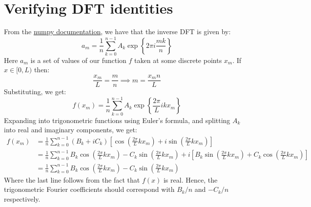 \documentclass[reqno]{article}
\begin{document}
\section{Verifying DFT identities}
From the \href{https://numpy.org/doc/stable/reference/routines.fft.html#implementation-details}{numpy documentation}, we have that the inverse DFT is given by:
\begin{equation}
    a_m
    =
    \frac{1}{n} \sum_{k = 0}^{n - 1} A_k \exp \left\{ 2\pi i \frac{mk}{n} \right\}
\end{equation}
Here $a_m$ is a set of values of our function $f$ taken at some discrete points $x_m$.
If $x \in [0, L)$ then:
\begin{equation}
    \frac{x_m}{L} = \frac{m}{n}
    \implies
    m = \frac{x_m n}{L}
\end{equation}
Substituting, we get:
\begin{equation}
    f(x_m)
    =
    \frac{1}{n}
    \sum_{k = 0}^{n - 1}
    A_k \exp \left\{ \frac{2 \pi}{L} i k x_m \right\}
\end{equation}
Expanding into trigonometric functions using Euler's formula, and splitting $A_k$ into real and imaginary components, we get:
\begin{equation}
    \begin{split}
        f(x_m)
        &=
        \frac{1}{n}
        \sum_{k = 0}^{n - 1}
        \left(B_k + i C_k \right) \left[
            \cos\left(\frac{2\pi}{L} k x_m\right)
            + i \sin\left(\frac{2\pi}{L} k x_m \right)
        \right] \\
        &=
        \frac{1}{n}
        \sum_{k = 0}^{n - 1}
            B_k \cos\left(\frac{2\pi}{L} k x_m\right)
            - C_k \sin\left(\frac{2\pi}{L} k x_m \right)
            + i \left[
                B_k \sin\left(\frac{2\pi}{L} k x_m \right)
                + C_k \cos\left(\frac{2\pi}{L} k x_m\right)
            \right] \\
        &=
        \frac{1}{n}
        \sum_{k = 0}^{n - 1}
            B_k \cos\left(\frac{2\pi}{L} k x_m\right)
            - C_k \sin\left(\frac{2\pi}{L} k x_m \right)
    \end{split}
\end{equation}
Where the last line follows from the fact that $f(x)$ is real.
Hence, the trigonometric Fourier coefficients should correspond with $B_k / n$ and $-C_k / n$ respectively.
\end{document}
